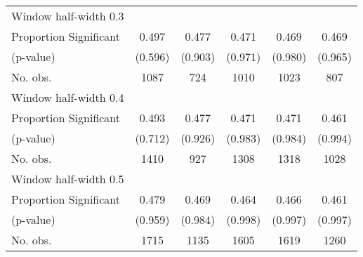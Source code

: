 \begin{tabular}{l*{5}{c}}
\hline
Window half-width 0.3\\

Proportion Significant& 0.497 &  0.477 &  0.471 &  0.469 &  0.469\\

(p-value) & (0.596) &  (0.903) &  (0.971) &  (0.980) &  (0.965)\\

No. obs.& 1087 &  724 &  1010 &  1023 &  807\\

\hline
Window half-width 0.4\\

Proportion Significant& 0.493 &  0.477 &  0.471 &  0.471 &  0.461\\

(p-value) & (0.712) &  (0.926) &  (0.983) &  (0.984) &  (0.994)\\

No. obs.& 1410 &  927 &  1308 &  1318 &  1028\\

\hline
Window half-width 0.5\\

Proportion Significant& 0.479 &  0.469 &  0.464 &  0.466 &  0.461\\

(p-value) & (0.959) &  (0.984) &  (0.998) &  (0.997) &  (0.997)\\

No. obs.& 1715 &  1135 &  1605 &  1619 &  1260\\

\hline\hline
\end{tabular}

